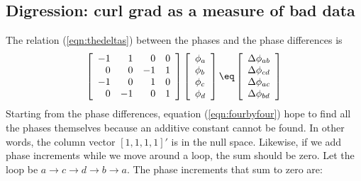 \subsection{Digression: curl grad as a measure of bad data}
The relation (\ref{eqn:thedeltas}) between the phases and the phase differences is
\begin{equation}
\left[
        \begin{array}{rrrr}
                -1 &  1&  0& 0 \\
                 0 &  0& -1& 1 \\
                -1 &  0&  1& 0 \\
                 0 & -1&  0& 1
        \end{array}
\right]
\left[
        \begin{array}{l}
                \phi_a \\
                \phi_b \\
                \phi_c \\
                \phi_d 
        \end{array}
\right]
\eq
\left[
        \begin{array}{l}
                \Delta \phi_{ab} \\
                \Delta \phi_{cd} \\
                \Delta \phi_{ac} \\
                \Delta \phi_{bd} 
        \end{array}
\right]
\label{eqn:fourbyfour}
\end{equation}
Starting from the phase differences,
equation (\ref{eqn:fourbyfour}) hope to find all the phases themselves
because an additive constant cannot be found.
In other words,
the column vector $[1,1,1,1]'$ is in the null space.
Likewise, if we add phase increments while we move around a loop,
the sum should be zero.
Let the loop be
$ a \rightarrow c \rightarrow d \rightarrow b \rightarrow a $.
The phase increments that sum to zero are:

